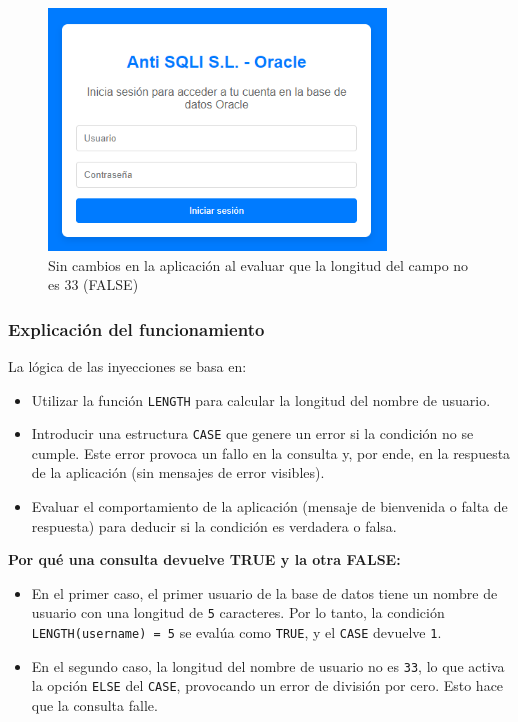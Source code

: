 \documentclass[a4paper,12pt]{article}
\begin{document}
\begin{figure}[H]
    \centering
    \includegraphics[width=0.8\textwidth]{Imagenes/blind5.png}
    \caption{Sin cambios en la aplicación al evaluar que la longitud del campo no es 33 (FALSE)}
\end{figure}

\subsubsection{Explicación del funcionamiento}

La lógica de las inyecciones se basa en:
\begin{itemize}
    \item Utilizar la función \texttt{LENGTH} para calcular la longitud del nombre de usuario.
    \item Introducir una estructura \texttt{CASE} que genere un error si la condición no se cumple. Este error provoca un fallo en la consulta y, por ende, en la respuesta de la aplicación (sin mensajes de error visibles).
    \item Evaluar el comportamiento de la aplicación (mensaje de bienvenida o falta de respuesta) para deducir si la condición es verdadera o falsa.
\end{itemize}

\textbf{Por qué una consulta devuelve TRUE y la otra FALSE:}
\begin{itemize}
    \item En el primer caso, el primer usuario de la base de datos tiene un nombre de usuario con una longitud de \texttt{5} caracteres. Por lo tanto, la condición \texttt{LENGTH(username) = 5} se evalúa como \texttt{TRUE}, y el \texttt{CASE} devuelve \texttt{1}.
    \item En el segundo caso, la longitud del nombre de usuario no es \texttt{33}, lo que activa la opción \texttt{ELSE} del \texttt{CASE}, provocando un error de división por cero. Esto hace que la consulta falle.
\end{itemize}
\end{document}
